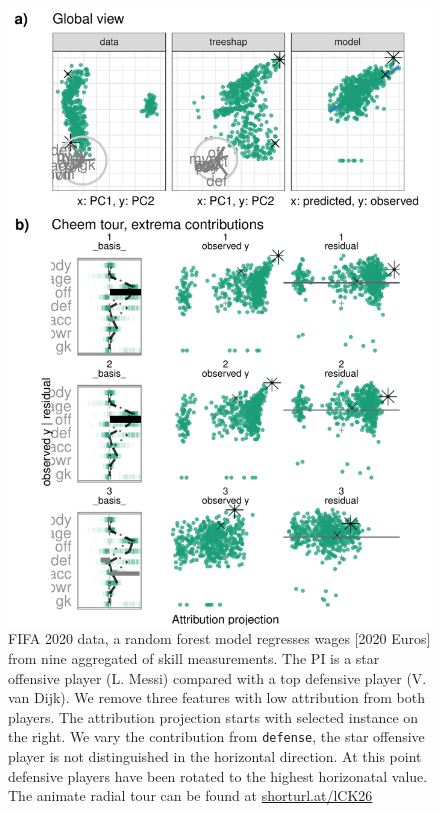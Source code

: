 \documentclass[
]{article}
\begin{document}
\begin{figure}

{\centering \includegraphics[width=1\linewidth]{./figures/case_fifa} 

}

\caption{FIFA 2020 data, a random forest model regresses wages {[}2020 Euros{]} from nine aggregated of skill measurements. The PI is a star offensive player (L. Messi) compared with a top defensive player (V. van Dijk). We remove three features with low attribution from both players. The attribution projection starts with selected instance on the right. We vary the contribution from \texttt{defense}, the star offensive player is not distinguished in the horizontal direction. At this point defensive players have been rotated to the highest horizonatal value. The animate radial tour can be found at \href{https://github.com/nspyrison/cheem_paper/blob/main/figures/case_fifa.mp4}{shorturl.at/lCK26}}\label{fig:casefifa}
\end{figure}
\end{document}
